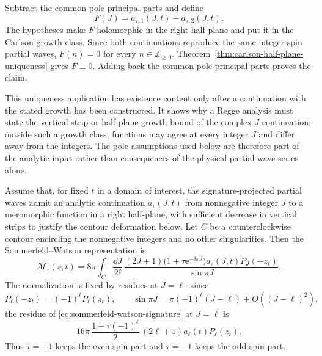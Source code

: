 Subtract the common pole principal parts and define
\[
  F(J)=a_{\tau,1}(J,t)-a_{\tau,2}(J,t).
\]
The hypotheses make \(F\) holomorphic in the right half-plane and put it in
the Carlson growth class.  Since both continuations reproduce the same
integer-spin partial waves, \(F(n)=0\) for every \(n\in\mathbb Z_{\ge0}\).
Theorem~\ref{thm:carlson-half-plane-uniqueness} gives
\(F\equiv0\).  Adding back the common pole principal parts proves the claim.

This uniqueness application has existence content only after a continuation
with the stated growth has been constructed.  It shows why a Regge analysis
must state the vertical-strip or half-plane growth bound of the complex-\(J\)
continuation: outside such a growth class, functions may agree at every
integer \(J\) and differ away from the integers.  The pole assumptions used
below are therefore part of the analytic input rather than consequences of the
physical partial-wave series alone.

Assume that, for fixed \(t\) in a domain of interest, the signature-projected
partial waves admit an analytic continuation \(a_\tau(J,t)\) from
nonnegative integer \(J\) to a meromorphic function in a right half-plane, with
sufficient decrease in vertical strips to justify the contour deformation
below.  Let \(C\) be a counterclockwise contour encircling the nonnegative
integers and no other singularities.  Then the Sommerfeld--Watson
representation is
\begin{equation}
  \mathcal M_\tau(s,t)
  =
  8\pi
  \int_C\frac{\dd J}{2\ii}\,
  \frac{(2J+1)\bigl(1+\tau\ee^{-\ii\pi J}\bigr)
  a_\tau(J,t)P_J(-z_t)}{\sin\pi J}.
  \label{eq:sommerfeld-watson-signature}
\end{equation}
The normalization is fixed by residues at \(J=\ell\): since
\[
  P_\ell(-z_t)=(-1)^\ell P_\ell(z_t),
  \qquad
  \sin\pi J=\pi(-1)^\ell(J-\ell)+O((J-\ell)^2),
\]
the residue of \eqref{eq:sommerfeld-watson-signature} at \(J=\ell\) is
\[
  16\pi\,\frac{1+\tau(-1)^\ell}{2}\,
  (2\ell+1)a_\ell(t)P_\ell(z_t).
\]
Thus \(\tau=+1\) keeps the even-spin part and \(\tau=-1\) keeps the odd-spin
part.

